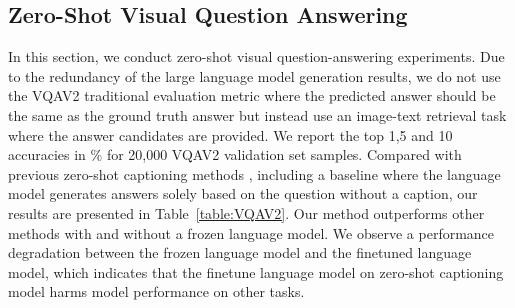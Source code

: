 \subsection{Zero-Shot Visual Question Answering}
In this section, we conduct zero-shot visual question-answering experiments. Due to the redundancy of the large language model generation results, we do not use the VQAV2 traditional evaluation metric where the predicted answer should be the same as the ground truth answer but instead use an image-text retrieval task where the answer candidates are provided. We report the top 1,5 and 10 accuracies in $\%$ for 20,000 VQAV2 validation set samples.
Compared with previous zero-shot captioning methods \cite{DeCap,CapDec}, including a baseline where the language model generates answers solely based on the question without a caption, our results are presented in Table~\ref{table:VQAV2}. Our method outperforms other methods with and without a frozen language model. We observe a performance degradation between the frozen language model and the finetuned language model, which indicates that the finetune language model on zero-shot captioning model harms model performance on other tasks.

